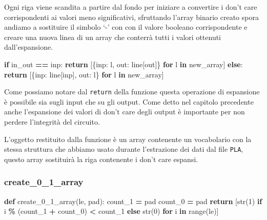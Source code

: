 \documentclass[
]{book}
\newenvironment{Shaded}{\begin{snugshade}}{\end{snugshade}}
\newcommand{\BuiltInTok}[1]{#1}
\newcommand{\ControlFlowTok}[1]{\textcolor[rgb]{0.13,0.29,0.53}{\textbf{#1}}}
\newcommand{\DecValTok}[1]{\textcolor[rgb]{0.00,0.00,0.81}{#1}}
\newcommand{\KeywordTok}[1]{\textcolor[rgb]{0.13,0.29,0.53}{\textbf{#1}}}
\newcommand{\NormalTok}[1]{#1}
\newcommand{\OperatorTok}[1]{\textcolor[rgb]{0.81,0.36,0.00}{\textbf{#1}}}
\newcommand{\StringTok}[1]{\textcolor[rgb]{0.31,0.60,0.02}{#1}}
\begin{document}
Ogni riga viene scandita a partire dal fondo per iniziare a convertire i don't care corrispondenti ai valori meno significativi, sfruttando l'array binario creato spora andiamo a sostituire il simbolo `-' con con il valore booleano corrispondente e creare una nuova linea di un array che conterrà tutti i valori ottenuti dall'espansione.

\newpage

\begin{Shaded}
\begin{Highlighting}[]
\ControlFlowTok{if}\NormalTok{ in\_out }\OperatorTok{==} \StringTok{\textquotesingle{}inp\textquotesingle{}}\NormalTok{:}
  \ControlFlowTok{return}\NormalTok{ [\{}\StringTok{\textquotesingle{}inp\textquotesingle{}}\NormalTok{:  l, }\StringTok{\textquotesingle{}out\textquotesingle{}}\NormalTok{:  line[}\StringTok{\textquotesingle{}out\textquotesingle{}}\NormalTok{]\} }\ControlFlowTok{for}\NormalTok{ l }\KeywordTok{in}\NormalTok{ new\_array]}
\ControlFlowTok{else}\NormalTok{:}
  \ControlFlowTok{return}\NormalTok{ [\{}\StringTok{\textquotesingle{}inp\textquotesingle{}}\NormalTok{:  line[}\StringTok{\textquotesingle{}inp\textquotesingle{}}\NormalTok{], }\StringTok{\textquotesingle{}out\textquotesingle{}}\NormalTok{:  l\} }\ControlFlowTok{for}\NormalTok{ l }\KeywordTok{in}\NormalTok{ new\_array]}
\end{Highlighting}
\end{Shaded}

Come possiamo notare dal \texttt{return} della funzione questa operazione di espansione è possibile sia sugli input che su gli output. Come detto nel capitolo precedente anche l'espansione dei valori di don't care degli output è importante per non perdere l'integrità del circuito.

L'oggetto restituito dalla funzione è un array contenente un vocabolario con la stessa struttura che abbiamo usato durante l'estrazione dei dati dal file \texttt{PLA}, questo array sostituirà la riga contenente i don't care espansi.

\hypertarget{create_0_1_array}{%
\subsubsection{create\_0\_1\_array}\label{create_0_1_array}}

\begin{Shaded}
\begin{Highlighting}[]
\KeywordTok{def}\NormalTok{ create\_0\_1\_array(le, pad):}
\NormalTok{  count\_1 }\OperatorTok{=}\NormalTok{ pad}
\NormalTok{  count\_0 }\OperatorTok{=}\NormalTok{ pad}
  \ControlFlowTok{return}\NormalTok{ [}\BuiltInTok{str}\NormalTok{(}\DecValTok{1}\NormalTok{) }\ControlFlowTok{if}\NormalTok{ i }\OperatorTok{\%}\NormalTok{ (count\_1 }\OperatorTok{+}\NormalTok{ count\_0) }\OperatorTok{\textless{}}\NormalTok{ count\_1 }
    \ControlFlowTok{else} \BuiltInTok{str}\NormalTok{(}\DecValTok{0}\NormalTok{) }\ControlFlowTok{for}\NormalTok{ i }\KeywordTok{in} \BuiltInTok{range}\NormalTok{(le)]}
\end{Highlighting}
\end{Shaded}
\end{document}
